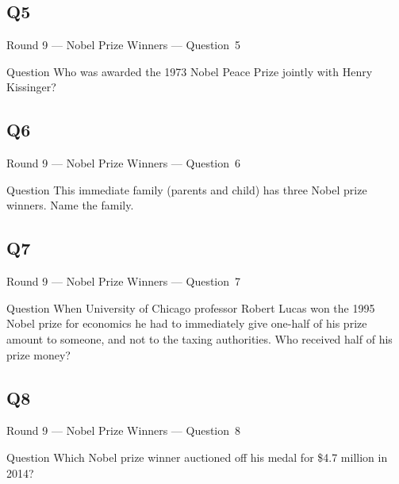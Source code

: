 \documentclass[11pt,draft]{beamer}
\begin{document}
\subsection*{Q5}
\begin{frame}[t]{Round 9 --- Nobel Prize Winners --- \mbox{Question 5}}
    \begin{block}{Question}
        Who was awarded the 1973 Nobel Peace Prize jointly with Henry Kissinger?
    \end{block}
\end{frame}
\subsection*{Q6}
\begin{frame}[t]{Round 9 --- Nobel Prize Winners --- \mbox{Question 6}}
    \begin{block}{Question}
        This immediate family (parents and child) has three Nobel prize winners.  Name the family.
    \end{block}
\end{frame}
\subsection*{Q7}
\begin{frame}[t]{Round 9 --- Nobel Prize Winners --- \mbox{Question 7}}
    \begin{block}{Question}
        When University of Chicago professor Robert Lucas won the 1995 Nobel prize for economics he had to immediately give one-half of his prize amount to someone, and not to the taxing authorities. Who received half of his prize money?
    \end{block}
\end{frame}
\subsection*{Q8}
\begin{frame}[t]{Round 9 --- Nobel Prize Winners --- \mbox{Question 8}}
    \begin{block}{Question}
        Which Nobel prize winner auctioned off his medal for \$4.7 million in 2014?
    \end{block}
\end{frame}
\end{document}
